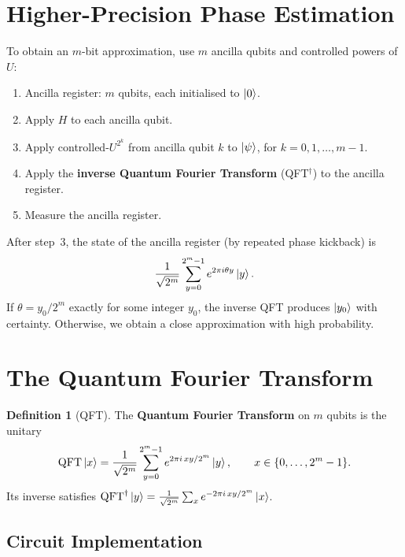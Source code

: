 \documentclass[11pt]{article}
\theoremstyle{definition}
\newtheorem{definition}{Definition}[section]
\begin{document}
\section{Higher-Precision Phase Estimation}

To obtain an $m$-bit approximation, use $m$ ancilla qubits and controlled powers of $U$:

\begin{enumerate}
    \item Ancilla register: $m$ qubits, each initialised to $\ket{0}$.
    \item Apply $H$ to each ancilla qubit.
    \item Apply controlled-$U^{2^k}$ from ancilla qubit $k$ to $\ket{\psi}$, for $k=0,1,\dots,m-1$.
    \item Apply the \textbf{inverse Quantum Fourier Transform} (QFT$^\dagger$) to the ancilla register.
    \item Measure the ancilla register.
\end{enumerate}

After step~3, the state of the ancilla register (by repeated phase kickback) is
\[
    \frac{1}{\sqrt{2^m}}\sum_{y=0}^{2^m-1}e^{2\pi i\theta y}\ket{y}.
\]
If $\theta = y_0/2^m$ exactly for some integer $y_0$, the inverse QFT produces $\ket{y_0}$ with certainty.  Otherwise, we obtain a close approximation with high probability.

\section{The Quantum Fourier Transform}

\begin{definition}[QFT]
The \textbf{Quantum Fourier Transform} on $m$ qubits is the unitary
\[
    \mathrm{QFT}\ket{x} = \frac{1}{\sqrt{2^m}}\sum_{y=0}^{2^m-1}e^{2\pi i\,xy/2^m}\ket{y},
    \qquad x\in\{0,\dots,2^m-1\}.
\]
Its inverse satisfies $\mathrm{QFT}^\dagger\ket{y}=\frac{1}{\sqrt{2^m}}\sum_x e^{-2\pi i\,xy/2^m}\ket{x}$.
\end{definition}

\subsection{Circuit Implementation}
\end{document}
